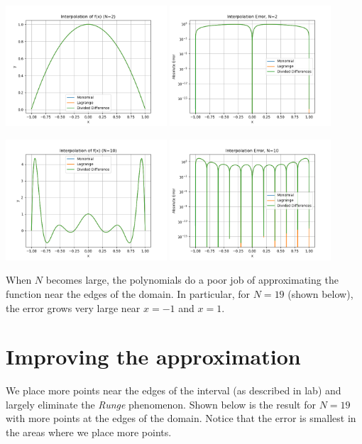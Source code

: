 \documentclass[10pt]{article}
\begin{document}
\begin{center}
  \includegraphics[width=0.45\textwidth]{lab7_interp_N2.png}
  \includegraphics[width=0.45\textwidth]{lab7_interp_error_N2.png}

  \includegraphics[width=0.45\textwidth]{lab7_interp_N10.png}
  \includegraphics[width=0.45\textwidth]{lab7_interp_error_N10.png}
\end{center}

When \(N\) becomes large, the polynomials do a poor job of approximating the function near the edges of the domain. In particular, for \(N=19\) (shown below), the error grows very large near \(x=-1\) and \(x=1\). 

\section{Improving the approximation}
We place more points near the edges of the interval (as described in lab) and largely eliminate the \textit{Runge} phenomenon. Shown below is the result for \(N=19\) with more points at the edges of the domain. Notice that the error is smallest in the areas where we place more points.
\end{document}

